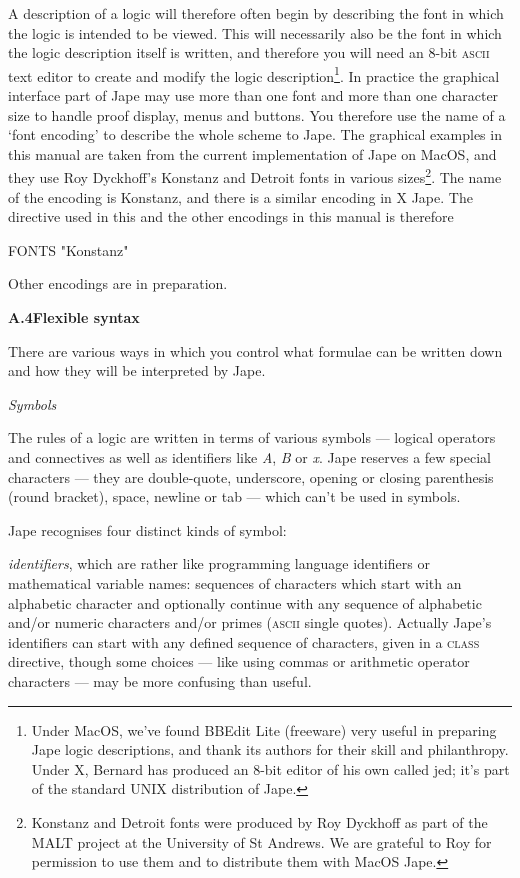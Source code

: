 A description of a logic will therefore often begin by describing the font in which the logic is intended to be viewed. This will necessarily also be the font in which the logic description itself is written, and therefore you will need an 8-bit \textsc{ascii} text editor to create and modify the logic description\footnote{Under MacOS, we've found BBEdit Lite (freeware) very useful in preparing Jape logic descriptions, and thank its authors for their skill and philanthropy. Under X, Bernard has produced an 8-bit editor of his own called jed; it's part of the standard UNIX distribution of Jape.}. In practice the graphical interface part of Jape may use more than one font and more than one character size to handle proof display, menus and buttons. You therefore use the name of a `font encoding' to describe the whole scheme to Jape. The graphical examples in this manual are taken from the current implementation of Jape on MacOS, and they use Roy Dyckhoff's Konstanz and Detroit fonts in various sizes\footnote{Konstanz and Detroit fonts were produced by Roy Dyckhoff as part of the MALT project at the University of St Andrews. We are grateful to Roy for permission to use them and to distribute them with MacOS Jape.}. The name of the encoding is Konstanz, and there is a similar encoding in X Jape. The directive used in this and the other encodings in this manual is therefore

FONTS "Konstanz"


Other encodings are in preparation.


\textbf{{\large A.4\tab Flexible syntax}}


There are various ways in which you control what formulae can be written down and how they will be interpreted by Jape.


\textit{Symbols}


The rules of a logic are written in terms of various symbols --- logical operators and connectives as well as identifiers like \textit{A}, \textit{B} or \textit{x}. Jape reserves a few special characters --- they are double-quote, underscore, opening or closing parenthesis (round bracket), space, newline or tab --- which can't be used in symbols.


Jape recognises four distinct kinds of symbol:


{\textbullet}\tab \textit{identifiers}, which are rather like programming language identifiers or mathematical variable names: sequences of characters which start with an alphabetic character and optionally continue with any sequence of alphabetic and/or numeric characters and/or primes (\textsc{ascii} single quotes). Actually Jape's identifiers can start with any defined sequence of characters, given in a \textsc{class} directive, though some choices --- like using commas or arithmetic operator characters --- may be more confusing than useful.


